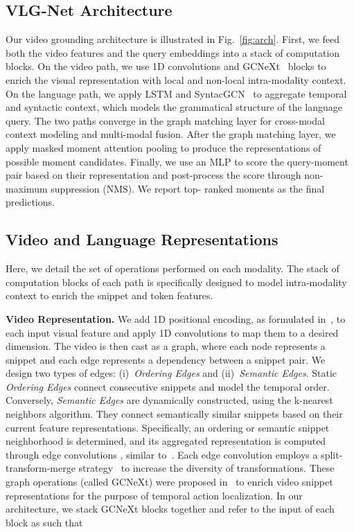 \documentclass[10pt,twocolumn,letterpaper]{article}
\begin{document}
\subsection{VLG-Net Architecture}
Our video grounding architecture is illustrated in Fig.~\ref{fig:arch}. 
First, we feed both the video features  and the query embeddings  into a stack of computation blocks. On the video path, we use 1D convolutions and GCNeXt~\cite{Xu_2020_CVPR} blocks to enrich the visual representation with local and non-local intra-modality context. On the language path, we apply LSTM and SyntacGCN~\cite{huang2020aligned} to aggregate temporal and syntactic context, which models the grammatical structure of the language query. The two paths converge in the graph matching layer for cross-modal context modeling and multi-modal fusion. After the graph matching layer, we apply masked moment attention pooling to produce the representations of possible moment candidates. Finally, we use an MLP to score the query-moment pair based on their representation and post-process the score through non-maximum suppression (NMS). We report top- ranked moments as the final predictions.


\subsection{Video and Language Representations}\label{subsec: GCNeXt}
Here, we detail the set of operations performed on each modality. The stack of computation blocks of each path is specifically designed to model intra-modality context to enrich the snippet and token features.

\noindent\textbf{Video Representation.} We add 1D positional encoding, as formulated in~\cite{devlin2018bert}, to each input visual feature and apply 1D convolutions to map them to a desired dimension.
The video is then cast as a graph, where each node represents a snippet and each edge represents a dependency between a snippet pair. We design two types of edges: (i)~\textit{Ordering Edges} and (ii)~\textit{Semantic Edges}. Static \textit{Ordering Edges} connect consecutive snippets and model the temporal order. Conversely, \textit{Semantic Edges} are dynamically constructed, using the k-nearest neighbors algorithm. They connect semantically similar snippets based on their current feature representations. Specifically, an ordering or semantic snippet neighborhood is determined, and its aggregated representation is computed through edge convolutions , similar to~\cite{wang2018dynamic}. Each edge convolution employs a split-transform-merge strategy~\cite{xie2017aggregated} to increase the diversity of transformations. These graph operations (called GCNeXt) were proposed in~\cite{Xu_2020_CVPR} to enrich video snippet representations for the purpose of temporal action localization. In our architecture, we stack  GCNeXt blocks together and refer to the input of each block as  such that
\end{document}
